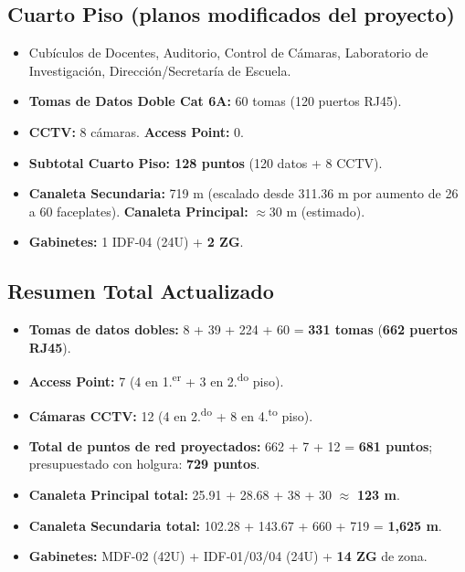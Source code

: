 \subsection*{Cuarto Piso (planos modificados del proyecto)}

\begin{itemize}
    \item Cubículos de Docentes, Auditorio, Control de Cámaras, Laboratorio de
          Investigación, Dirección/Secretaría de Escuela.
    \item \textbf{Tomas de Datos Doble Cat 6A:} 60 tomas (120 puertos RJ45).
    \item \textbf{CCTV:} 8 cámaras. \textbf{Access Point:} 0.
    \item \textbf{Subtotal Cuarto Piso: 128 puntos} (120 datos + 8 CCTV).
    \item \textbf{Canaleta Secundaria:} 719 m (escalado desde 311.36 m por aumento de 26 a 60 faceplates). \textbf{Canaleta Principal:} $\approx$30 m (estimado).
    \item \textbf{Gabinetes:} 1 IDF-04 (24U) + \textbf{2 ZG}.
\end{itemize}

\subsection*{Resumen Total Actualizado}

\begin{itemize}
    \item \textbf{Tomas de datos dobles:} 8 + 39 + 224 + 60 = \textbf{331 tomas} (\textbf{662 puertos RJ45}).
    \item \textbf{Access Point:} 7 (4 en 1.\textsuperscript{er} + 3 en 2.\textsuperscript{do} piso).
    \item \textbf{Cámaras CCTV:} 12 (4 en 2.\textsuperscript{do} + 8 en 4.\textsuperscript{to} piso).
    \item \textbf{Total de puntos de red proyectados:} 662 + 7 + 12 = \textbf{681 puntos};
          presupuestado con holgura: \textbf{729 puntos}.
    \item \textbf{Canaleta Principal total:} 25.91 + 28.68 + 38 + 30 $\approx$ \textbf{123 m}.
    \item \textbf{Canaleta Secundaria total:} 102.28 + 143.67 + 660 + 719 = \textbf{1,625 m}.
    \item \textbf{Gabinetes:} MDF-02 (42U) + IDF-01/03/04 (24U) + \textbf{14 ZG} de zona.
\end{itemize}

